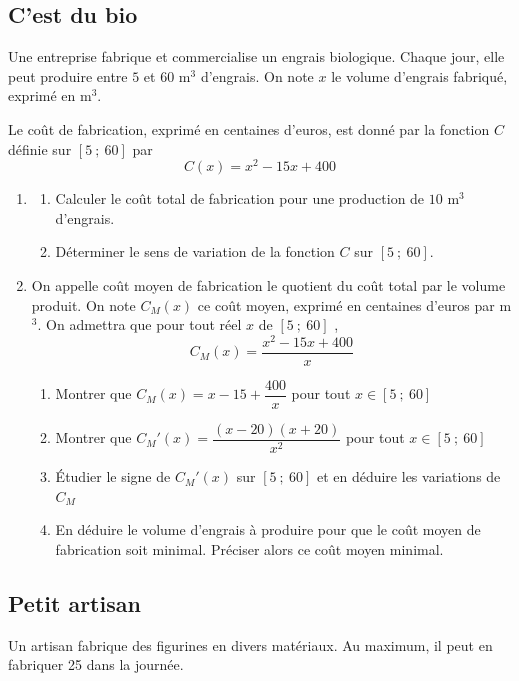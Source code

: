 \documentclass[oneside,12pt]{article}          %
\begin{document}
\newpage



\subsection{C'est du bio}
Une entreprise fabrique et commercialise un engrais biologique. Chaque jour, elle peut produire entre $5$ et $60$ m$^3$ d'engrais. On note $x$ le volume d'engrais fabriqué, exprimé en m$^3$.

Le coût de fabrication, exprimé en centaines d'euros, est donné par la fonction $C$ définie sur $[5 ~;~ 60]$ par 
$$C(x)=x^2-15x+400$$
\begin{enumerate}[itemsep = 1mm]
	\item 
	\begin{enumerate}[itemsep = 1mm]
		\item Calculer le coût total de fabrication pour une production de $10$ m$^3$ d'engrais.
		\item Déterminer le sens de variation de la fonction $C$ sur $[5 ~;~ 60]$.
	\end{enumerate}
	\item On appelle coût moyen de fabrication le quotient du coût total par le volume produit. On note $C_M(x)$ ce coût moyen, exprimé en centaines d'euros par m$^3$. On admettra que pour tout réel $x$ de $[5 ~;~ 60]$ ,
	$$C_M(x) = \dfrac{x^2 - 15x + 400}{x}$$
	\begin{enumerate}[itemsep = 1mm]
		\item Montrer que $C_M(x) = x - 15 + \dfrac{400}{x}$ \quad pour tout $x \in [5 ~;~ 60]$
		\item Montrer que ${C_M}'(x) = \dfrac{(x - 20)(x + 20)}{x^2}$ \quad pour tout $x \in [5 ~;~ 60]$
		\item Étudier le signe de ${C_M}'(x)$ sur $[5 ~;~ 60]$ et en déduire les variations de $C_M$
		\item En déduire le volume d'engrais à produire pour que le coût moyen de fabrication soit minimal. Préciser alors ce coût moyen minimal.
	\end{enumerate}
\end{enumerate}



\subsection{Petit artisan}
Un artisan fabrique des figurines en divers matériaux. Au maximum, il peut en fabriquer 25 dans la journée. 
\end{document}
